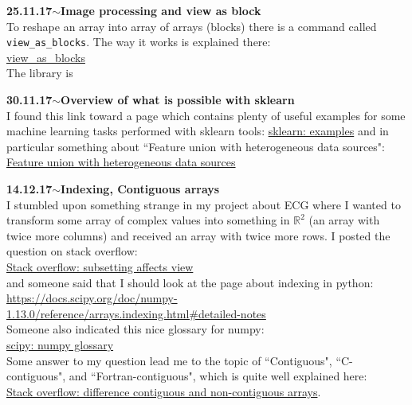 \documentclass[11pt,a4paper]{article}
\newenvironment{loggentry}[2]%
{\noindent\textbf{#1}\hspace{1cm}$\mathbf{\sim}$\text{ }\textbf{#2}\\}{\vspace{0.5cm}}
\begin{document}
\begin{loggentry}{25.11.17}{Image processing and view as block}
To reshape an array into array of arrays (blocks) there is a command called \texttt{view\_as\_blocks}. The way it works is explained there:\\
\href{http://scikit-image.org/docs/dev/api/skimage.util.html#skimage.util.view_as_blocks}{view\_as\_blocks}\\
The library is 
\end{loggentry}

\begin{loggentry}{30.11.17}{Overview of what is possible with sklearn}
I found this link toward a page which contains plenty of useful examples for some machine learning tasks performed with sklearn tools:
\href{http://scikit-learn.org/stable/auto_examples/index.html}{sklearn: examples}
and in particular something about ``Feature union with heterogeneous data sources":\\
\href{http://scikit-learn.org/stable/auto_examples/hetero_feature_union.html#sphx-glr-auto-examples-hetero-feature-union-py}{Feature union with heterogeneous data sources}
\end{loggentry}

\begin{loggentry}{14.12.17}{Indexing, Contiguous arrays}
I stumbled upon something strange in my project about ECG where I wanted to transform some array of complex values into something in $\mathbb{R}^2$ (an array with twice more columns) and received an array with twice more rows. I posted the question on stack overflow:\\
\href{https://stackoverflow.com/questions/47796207/subsetting-affects-viewnp-float64-behaviour}{Stack overflow: subsetting affects view}\\
and someone said that I should look at the page about indexing in python:\\
\url{https://docs.scipy.org/doc/numpy-1.13.0/reference/arrays.indexing.html#detailed-notes}\\
Someone also indicated this nice glossary for numpy:\\
\href{https://docs.scipy.org/doc/numpy-1.13.0/glossary.html#term-view}{scipy: numpy glossary}\\
Some answer to my question lead me to the topic of ``Contiguous", ``C-contiguous", and ``Fortran-contiguous", which is quite well explained here:\\
\href{https://stackoverflow.com/questions/26998223/what-is-the-difference-between-contiguous-and-non-contiguous-arrays#26999092}{Stack overflow: difference contiguous and non-contiguous arrays}.
\end{loggentry}
\end{document}
